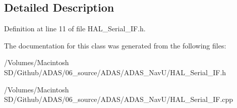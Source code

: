 \subsection{Detailed Description}


Definition at line 11 of file H\+A\+L\+\_\+\+Serial\+\_\+\+I\+F.\+h.



The documentation for this class was generated from the following files\+:\begin{DoxyCompactItemize}
\item 
/\+Volumes/\+Macintosh S\+D/\+Github/\+A\+D\+A\+S/06\+\_\+source/\+A\+D\+A\+S/\+A\+D\+A\+S\+\_\+\+Nav\+U/H\+A\+L\+\_\+\+Serial\+\_\+\+I\+F.\+h\item 
/\+Volumes/\+Macintosh S\+D/\+Github/\+A\+D\+A\+S/06\+\_\+source/\+A\+D\+A\+S/\+A\+D\+A\+S\+\_\+\+Nav\+U/H\+A\+L\+\_\+\+Serial\+\_\+\+I\+F.\+cpp\end{DoxyCompactItemize}
